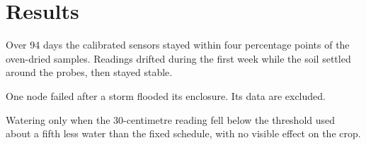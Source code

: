 \chapter{Results}
\label{ch:results}

Over 94 days the calibrated sensors stayed within four percentage points of
the oven-dried samples. Readings drifted during the first week while the soil
settled around the probes, then stayed stable.

\begin{remark}
One node failed after a storm flooded its enclosure. Its data are excluded.
\end{remark}

Watering only when the 30-centimetre reading fell below the threshold used
about a fifth less water than the fixed schedule, with no visible effect on
the crop.

